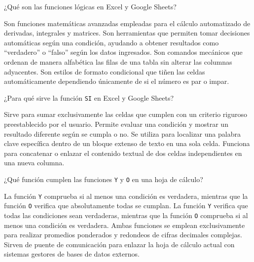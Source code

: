 \documentclass[12pt]{evaluasep}
\begin{document}
\begin{questions}
\begin{choices}
    \end{choices}
    

    \question ¿Qué son las funciones lógicas en Excel y Google Sheets?
    
    \begin{choices}
        \choice Son funciones matemáticas avanzadas empleadas para el cálculo automatizado de derivadas, integrales y matrices.
        \CorrectChoice Son herramientas que permiten tomar decisiones automáticas según una condición, ayudando a obtener resultados como ``verdadero'' o ``falso'' según los datos ingresados.
        \choice Son comandos mecánicos que ordenan de manera alfabética las filas de una tabla sin alterar las columnas adyacentes.
        \choice Son estilos de formato condicional que tiñen las celdas automáticamente dependiendo únicamente de si el número es par o impar.
    
    \end{choices}
    

    \question ¿Para qué sirve la función \texttt{SI} en Excel y Google Sheets?
    
    \begin{choices}
        \choice Sirve para sumar exclusivamente las celdas que cumplen con un criterio riguroso preestablecido por el usuario.
        \CorrectChoice Permite evaluar una condición y mostrar un resultado diferente según se cumpla o no.
        \choice Se utiliza para localizar una palabra clave específica dentro de un bloque extenso de texto en una sola celda.
        \choice Funciona para concatenar o enlazar el contenido textual de dos celdas independientes en una nueva columna.
    
    \end{choices}
    

    \question ¿Qué función cumplen las funciones \texttt{Y} y \texttt{O} en una hoja de cálculo?
    
    \begin{choices}
        \choice La función \texttt{Y} comprueba si al menos una condición es verdadera, mientras que la función \texttt{O} verifica que absolutamente todas se cumplan.
        \CorrectChoice La función \texttt{Y} verifica que todas las condiciones sean verdaderas, mientras que la función \texttt{O} comprueba si al menos una condición es verdadera.
        \choice Ambas funciones se emplean exclusivamente para realizar promedios ponderados y redondeos de cifras decimales complejas.
        \choice Sirven de puente de comunicación para enlazar la hoja de cálculo actual con sistemas gestores de bases de datos externos.
    

\end{choices}
\end{questions}
\end{document}
